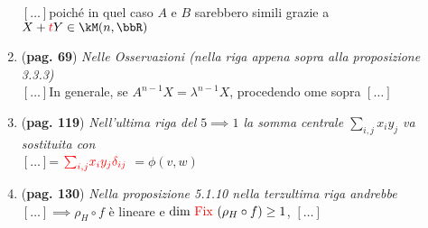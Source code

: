 \documentclass[a4paper,NoNotes,GeneralMath]{stdmdoc}
\newcommand{\omissis}{$\left[ \ldots \right]$\text{ }}
\newcommand{\err}[1]{\color{red}{#1}}
\begin{document}
\begin{enumerate}
		\omissis poiché in quel caso $A$ e $B$ sarebbero simili grazie a $X+{\err t}Y \in \kM(n, \bbR)$
		\item ({\bf pag. 69}) {\it Nelle Osservazioni (nella riga appena sopra alla proposizione 3.3.3) } \\
		\omissis In generale, se $A^{n-1}X = \lambda^{n-1}X$, procedendo {\err c}ome sopra \omissis
		\item ({\bf pag. 119}) {\it Nell'ultima riga del $5 \implies 1$ la somma centrale $\sum_{i,j} x_i y_j$ va sostituita con } \\
		\omissis = {$\err \sum_{i,j} x_i y_j \delta_{ij}$} $= \phi(v,w)$
		\item ({\bf pag. 130}) {\it Nella proposizione 5.1.10 nella terzultima riga andrebbe } \\
		\omissis $\implies \rho_H\circ f$ è lineare e $\Dim {\err \Fix} (\rho_H \circ f) \ge 1$, \omissis
	\end{enumerate}
\end{document}
